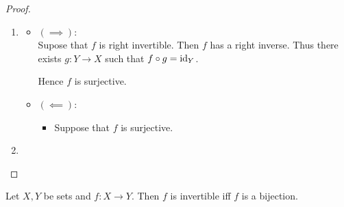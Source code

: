 \documentclass{book}
\begin{document}
\begin{proof}
\begin{enumerate}
\begin{itemize}
\begin{itemize}
\begin{align*}
						& \in f^{-1}(\{y\}). 
					\end{align*}
					Thus 
					\begin{align*}
						f(x_y) 
						& = y \\
						& = f(x). 
					\end{align*}
					Since $f$ is injective, we have that 
					\begin{align*}
						x_{f(x)}
						& = x_y \\
						& = x.
					\end{align*}
					Since $x \in X$ is arbitrary, we have that for each $x \in X$, $x_{f(x)} = x$.
					\item Then for each $x \in X$, 
					\begin{align*}
						g \circ f(x)
						& = g(f(x)) \\
						& = x_{f(x)} \\
						& = x \\
						& = \id_X(x). 
					\end{align*} 
					Hence $g \circ f = \id_X$. Thus $f$ has a left inverse and therefore $f$ is left invertible. 
				\end{itemize}
			\end{itemize}
			\item 
			\begin{itemize}
				\item $(\implies)$: \\
				Supose that $f$ is right invertible. Then $f$ has a right inverse. Thus there exists $g:Y \rightarrow X$ such that $f \circ g = \operatorname{id}_Y$. 
				
				Hence $f$ is surjective.
				\item $(\impliedby)$: \\
				\begin{itemize}
					\item Suppose that $f$ is surjective. 
				\end{itemize}
			\end{itemize}
			\item 
		\end{enumerate}
	\end{proof}
	
	\begin{ex}
		Let $X,Y$ be sets and $f:X \rightarrow Y$. Then $f$ is invertible iff $f$ is a bijection.
	\end{ex}
	
\end{document}
